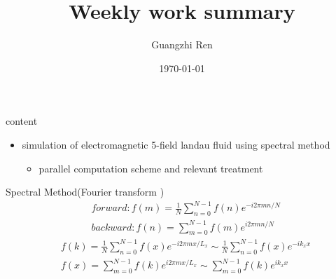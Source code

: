 \documentclass{beamer}
\title{Weekly work summary}
\author{Guangzhi Ren}
\institute {}
\date{\today}
\begin{document}
	
\begin{frame}
	\titlepage   
\end{frame}


\begin{frame}{content}
\begin{itemize}
	\item simulation of electromagnetic 5-field landau fluid using spectral method
	\begin{itemize}
		\item parallel computation scheme and relevant treatment 
	\end{itemize}
\end{itemize}
\end{frame}
%
%
%
%

\begin{frame}{Spectral Method(Fourier transform )}
	\begin{equation}
		\begin{aligned}
			& forward: f(m) = \frac{1}{N}\sum_{n=0}^{N-1}f(n)e^{-i2\pi{m}n/N}	\\
			& backward: f(n) = \sum_{m=0}^{N-1}f(m)e^{i2\pi{m}n/N}
		\end{aligned}
	\end{equation}
	\begin{equation}
		\begin{aligned}
			& f(k) = \frac{1}{N}\sum_{n=0}^{N-1}f(x)e^{-i2\pi{m}x/L_x}
			\sim\frac{1}{N}\sum_{n=0}^{N-1}f(x)e^{-ik_xx}	\\
			& f(x) = \sum_{m=0}^{N-1}f(k)e^{i2\pi{m}x/L_x}
			\sim\sum_{m=0}^{N-1}f(k)e^{ik_xx}
		\end{aligned}
	\end{equation}
\end{frame}
\end{document}
